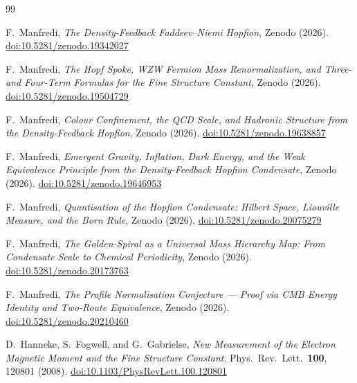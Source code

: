\documentclass[11pt,a4paper]{article}
\theoremstyle{definition}
\theoremstyle{remark}
\begin{document}
\begin{thebibliography}{99}

F.~Manfredi,
\textit{The Density-Feedback Faddeev--Niemi Hopfion},
Zenodo (2026).
\href{https://doi.org/10.5281/zenodo.19342027}{doi:10.5281/zenodo.19342027}

F.~Manfredi,
\textit{The Hopf Spoke, WZW Fermion Mass Renormalization, and
  Three- and Four-Term Formulas for the Fine Structure Constant},
Zenodo (2026).
\href{https://doi.org/10.5281/zenodo.19504729}{doi:10.5281/zenodo.19504729}

F.~Manfredi,
\textit{Colour Confinement, the QCD Scale, and Hadronic Structure
  from the Density-Feedback Hopfion},
Zenodo (2026).
\href{https://doi.org/10.5281/zenodo.19638857}{doi:10.5281/zenodo.19638857}

F.~Manfredi,
\textit{Emergent Gravity, Inflation, Dark Energy, and the Weak
  Equivalence Principle from the Density-Feedback Hopfion Condensate},
Zenodo (2026).
\href{https://doi.org/10.5281/zenodo.19646953}{doi:10.5281/zenodo.19646953}

F.~Manfredi,
\textit{Quantisation of the Hopfion Condensate: Hilbert Space,
  Liouville Measure, and the Born Rule},
Zenodo (2026).
\href{https://doi.org/10.5281/zenodo.20075279}{doi:10.5281/zenodo.20075279}

F.~Manfredi,
\textit{The Golden-Spiral as a Universal Mass Hierarchy Map:
  From Condensate Scale to Chemical Periodicity},
Zenodo (2026).
\href{https://doi.org/10.5281/zenodo.20173763}{doi:10.5281/zenodo.20173763}

F.~Manfredi,
\textit{The Profile Normalisation Conjecture ---
  Proof via CMB Energy Identity and Two-Route Equivalence},
Zenodo (2026).
\href{https://doi.org/10.5281/zenodo.20210460}{doi:10.5281/zenodo.20210460}

D.~Hanneke, S.~Fogwell, and G.~Gabrielse,
\textit{New Measurement of the Electron Magnetic Moment and
  the Fine Structure Constant},
Phys.\ Rev.\ Lett.\ \textbf{100}, 120801 (2008).
\href{https://doi.org/10.1103/PhysRevLett.100.120801}{doi:10.1103/PhysRevLett.100.120801}

\end{thebibliography}
\end{document}
